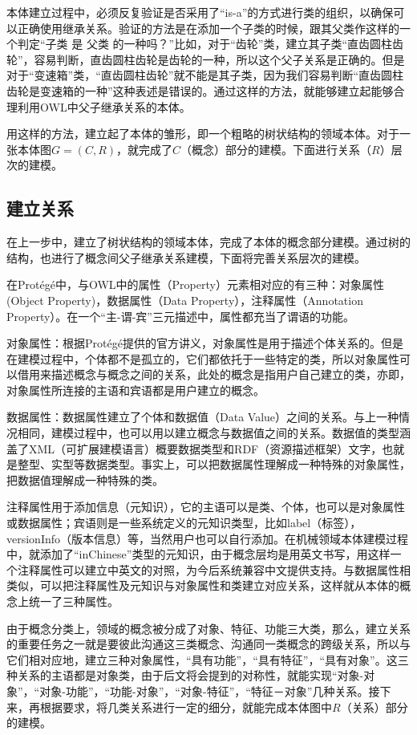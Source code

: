 \documentclass[12pt,a4paper]{article}
\begin{document}
	本体建立过程中，必须反复验证是否采用了“{\Times is-a}”的方式进行类的组织，以确保可以正确使用继承关系。验证的方法是在添加一个子类的时候，跟其父类作这样的一个判定“子类 是 父类 的一种吗？”比如，对于“齿轮”类，建立其子类“直齿圆柱齿轮”，容易判断，直齿圆柱齿轮是齿轮的一种，所以这个父子关系是正确的。但是对于“变速箱”类，“直齿圆柱齿轮”就不能是其子类，因为我们容易判断“直齿圆柱齿轮是变速箱的一种”这种表述是错误的。通过这样的方法，就能够建立起能够合理利用{\Times OWL}中父子继承关系的本体。
	
	用这样的方法，建立起了本体的雏形，即一个粗略的树状结构的领域本体。对于一张本体图$ G=(C,R) $，就完成了$C$（概念）部分的建模。下面进行关系（$R$）层次的建模。
	
	\subsection{建立关系}
	在上一步中，建立了树状结构的领域本体，完成了本体的概念部分建模。通过树的结构，也进行了概念间父子继承关系建模，下面将完善关系层次的建模。
	
	在{\Times Prot{\'e}g{\'e}}中，与{\Times OWL}中的属性（{\Times Property}）元素相对应的有三种：对象属性({\Times Object Property})，数据属性（{\Times Data Property}），注释属性（{\Times Annotation Property}）。在一个“主-谓-宾”三元描述中，属性都充当了谓语的功能。
	
	对象属性：根据{\Times Prot{\'e}g{\'e}}提供的官方讲义，对象属性是用于描述个体关系的。但是在建模过程中，个体都不是孤立的，它们都依托于一些特定的类，所以对象属性可以借用来描述概念与概念之间的关系，此处的概念是指用户自己建立的类，亦即，对象属性所连接的主语和宾语都是用户建立的概念。
	
	数据属性：数据属性建立了个体和数据值（{\Times Data Value}）之间的关系。与上一种情况相同，建模过程中，也可以用以建立概念与数据值之间的关系。数据值的类型涵盖了XML（可扩展建模语言）概要数据类型和{\Times RDF}（资源描述框架）文字，也就是整型、实型等数据类型。事实上，可以把数据属性理解成一种特殊的对象属性，把数据值理解成一种特殊的类。
	
	注释属性用于添加信息（元知识），它的主语可以是类、个体，也可以是对象属性或数据属性；宾语则是一些系统定义的元知识类型，比如{\Times label}（标签），{\Times versionInfo}（版本信息）等，当然用户也可以自行添加。在机械领域本体建模过程中，就添加了“{\Times inChinese}”类型的元知识，由于概念层均是用英文书写，用这样一个注释属性可以建立中英文的对照，为今后系统兼容中文提供支持。与数据属性相类似，可以把注释属性及元知识与对象属性和类建立对应关系，这样就从本体的概念上统一了三种属性。
	
	由于概念分类上，领域的概念被分成了对象、特征、功能三大类，那么，建立关系的重要任务之一就是要彼此沟通这三类概念、沟通同一类概念的跨级关系，所以与它们相对应地，建立三种对象属性，“具有功能”，“具有特征”，“具有对象”。这三种关系的主语都是对象类，由于后文将会提到的对称性，就能实现“对象-对象”，“对象-功能”，“功能-对象”，“对象-特征”，“特征－对象”几种关系。接下来，再根据要求，将几类关系进行一定的细分，就能完成本体图中$R$（关系）部分的建模。
	
\end{document}
